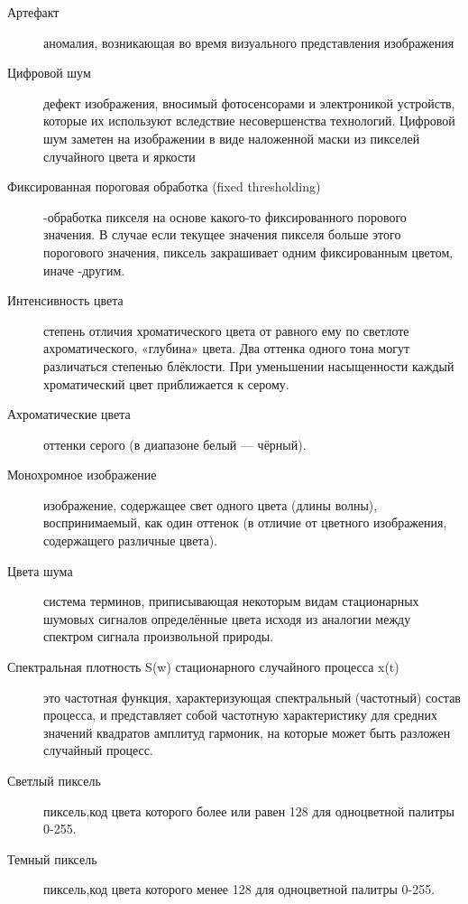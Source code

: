 \Defines %
\begin{description}
	
	\item[Артефакт]
	аномалия, возникающая во время визуального представления изображения\cite{Wiki_artifact}
	\item[Цифровой шум] дефект изображения, вносимый фотосенсорами и электроникой устройств, которые их используют вследствие несовершенства технологий.
	Цифровой шум заметен на изображении в виде наложенной маски из пикселей случайного цвета и яркости \cite{Wiki_noise}
	
	\item[Фиксированная пороговая обработка (fixed thresholding)] -обработка пикселя на основе какого-то фиксированного порового значения. В случае если текущее значения пикселя больше этого порогового значения, пиксель закрашивает одним фиксированным цветом, иначе -другим. 
	\cite{Dh}
	\item[Интенсивность цвета]  степень отличия хроматического цвета от равного ему по светлоте ахроматического, «глубина» цвета. Два оттенка одного тона могут различаться степенью блёклости. При уменьшении насыщенности каждый хроматический цвет приближается к серому.\cite{Wiki_intens}
	\item[Ахроматические цвета] оттенки серого (в диапазоне белый — чёрный).\cite{Wiki_achrom}
	\item[Монохромное изображение] изображение, содержащее свет одного цвета (длины волны), воспринимаемый, как один оттенок (в отличие от цветного изображения, содержащего различные цвета).\cite{Wiki_hrom}
	\item[Цвета шума]система терминов, приписывающая некоторым видам стационарных шумовых сигналов определённые цвета исходя из аналогии между спектром сигнала произвольной природы.\cite{Wiki_color_noise}
	\item[Спектральная плотность S(w) стационарного случайного процесса x(t) ] это частотная функция, характеризующая спектральный (частотный) состав процесса, и представляет собой частотную характеристику для средних значений квадратов амплитуд гармоник, на которые может быть разложен случайный процесс.\cite{Wiki_staz}
	\item[Светлый пиксель] пиксель,код цвета которого более или равен 128 для одноцветной палитры 0-255.
	\item[Темный пиксель] пиксель,код цвета которого менее  128 для одноцветной палитры 0-255.
	
	
	
\end{description}

